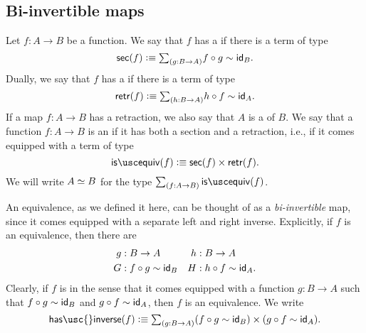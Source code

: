 \subsection{Bi-invertible maps}
\begin{defn}
Let $f:A\to B$ be a function. We say that $f$ has a  if there is a term of type
\begin{equation*}
\mathsf{sec}(f) \defeq \sm{g:B\to A} f\circ g\htpy \idfunc[B].
\end{equation*}
Dually, we say that $f$ has a  if there is a term of type
\begin{equation*}
\mathsf{retr}(f) \defeq \sm{h:B\to A} h\circ f\htpy \idfunc[A].
\end{equation*}
If a map $f:A \to B$ has a retraction, we also say that $A$ is a  of $B$.
We say that a function $f:A\to B$ is an  if it has both a section and a retraction, i.e., if it comes equipped with a term of type
\begin{equation*}
\isequiv(f)\defeq\mathsf{sec}(f)\times\mathsf{retr}(f).
\end{equation*}
We will write $\eqv{A}{B}$ for the type $\sm{f:A\to B}\isequiv(f)$.
\end{defn}

\begin{rmk}
An equivalence, as we defined it here, can be thought of as a \emph{bi-invertible} map, since it comes equipped with a separate left and right inverse. Explicitly, if $f$ is an equivalence, then there are
\begin{align*}
g & : B\to A & h & : B\to A \\
G & : f\circ g \htpy \idfunc[B] & H & : h\circ f \htpy \idfunc[A].
\end{align*}
Clearly, if $f$ is  in the sense that it comes equipped with a function $g:B\to A$ such that $f\circ g\htpy\idfunc[B]$ and $g\circ f\htpy\idfunc[A]$, then $f$ is an equivalence. We write
\begin{equation*}
\mathsf{has\usc{}inverse}(f)\defeq\sm{g:B\to A} (f\circ g\htpy \idfunc[B])\times (g\circ f\htpy\idfunc[A]).
\end{equation*}
\end{rmk}


